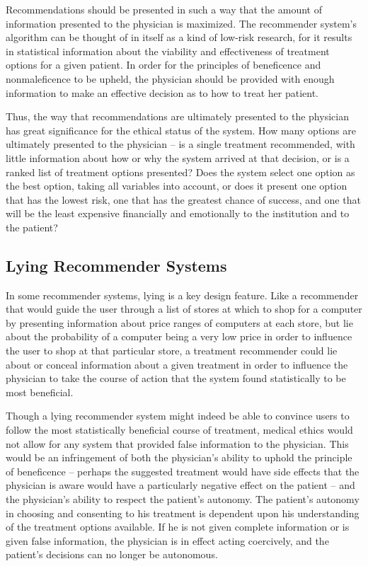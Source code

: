 \documentclass[]{spie}  %
\begin{document}
Recommendations should be presented in such a way that the amount of information presented to the physician is maximized. The recommender system’s algorithm can be thought of in itself as a kind of low-risk research, for it results in statistical information about the viability and effectiveness of treatment options for a given patient. In order for the principles of beneficence and nonmaleficence to be upheld, the physician should be provided with enough information to make an effective decision as to how to treat her patient.

Thus, the way that recommendations are ultimately presented to the physician has great significance for the ethical status of the system. How many options are ultimately presented to the physician – is a single treatment recommended, with little information about how or why the system arrived at that decision, or is a ranked list of treatment options presented? Does the system select one option as the best option, taking all variables into account, or does it present one option that has the lowest risk, one that has the greatest chance of success, and one that will be the least expensive financially and emotionally to the institution and to the patient?

\subsection{Lying Recommender Systems}

In some recommender systems, lying is a key design feature. Like a recommender that would guide the user through a list of stores at which to shop for a computer by presenting information about price ranges of computers at each store, but lie about the probability of a computer being a very low price in order to influence the user to shop at that particular store, a treatment recommender could lie about or conceal information about a given treatment in order to influence the physician to take the course of action that the system found statistically to be most beneficial.

Though a lying recommender system might indeed be able to convince users to follow the most statistically beneficial course of treatment, medical ethics would not allow for any system that provided false information to the physician. This would be an infringement of both the physician’s ability to uphold the principle of beneficence – perhaps the suggested treatment would have side effects that the physician is aware would have a particularly negative effect on the patient – and the physician’s ability to respect the patient’s autonomy. The patient’s autonomy in choosing and consenting to his treatment is dependent upon his understanding of the treatment options available. If he is not given complete information or is given false information, the physician is in effect acting coercively, and the patient’s decisions can no longer be autonomous.
\end{document}
